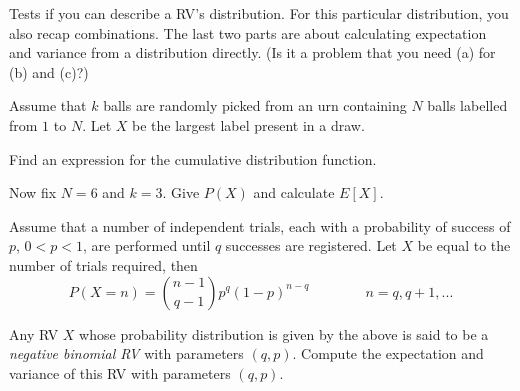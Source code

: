 \documentclass[a4paper,10pt,landscape,twocolumn]{scrartcl}
\begin{document}
\begin{exercise}[(3pt)]
\begin{mycomment}
	Tests if you can describe a RV's distribution. For this particular distribution, you also recap combinations. The last two parts are about calculating expectation and variance from a distribution directly. (Is it a problem that you need (a) for (b) and (c)?)
\end{mycomment}

Assume that $k$ balls are randomly picked from an urn containing $N$ balls labelled from $1$ to $N$. Let $X$ be the largest label present in a draw. 
	
	\begin{subex}[2pt]
		Find an expression for the cumulative distribution function.
	\end{subex}
	
	\begin{subex}[1pt]
	Now fix $N = 6$ and $k = 3$. Give $P(X)$ and calculate $E[X]$.
	\end{subex}
	
\end{exercise}


\begin{exercise}
 Assume that a number of independent trials, each with a probability of success of $p$, $0 < p < 1$, are performed until $q$ successes are registered. Let $X$ be equal to the number of trials required, then
	$$P(X = n) = {{n-1} \choose {q-1}} p^{q} (1 - p)^{n-q} \qquad \qquad n = q, q+1, ...$$

	Any RV $X$ whose probability distribution is given by the above is said to be a {\em negative binomial RV} with parameters $(q,p)$. Compute the expectation and variance of this RV with parameters $(q,p)$.	
\end{exercise}
\end{document}
